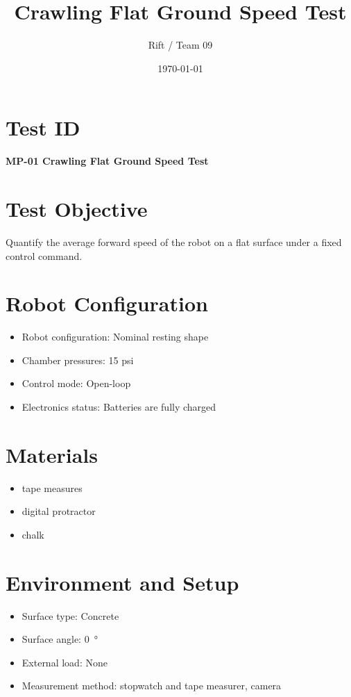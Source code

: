 \documentclass[11pt]{article}
\title{Crawling Flat Ground Speed Test}
\author{Rift / Team 09}
\date{\today}
\begin{document}
\maketitle

\section*{Test ID}
\textbf{MP-01 Crawling Flat Ground Speed Test} 

\section*{Test Objective}
Quantify the average forward speed of the robot on a flat surface under a fixed control command.

\section*{Robot Configuration}
\begin{itemize}[noitemsep]
    \item Robot configuration: Nominal resting shape
    \item Chamber pressures: 15 psi
    \item Control mode: Open-loop
    \item Electronics status: Batteries are fully charged
\end{itemize}

\section*{Materials}
\begin{itemize}[noitemsep]
    \item tape measures
    \item digital protractor
    \item chalk
    
\end{itemize}

\section*{Environment and Setup}
\begin{itemize}[noitemsep]
    \item Surface type: Concrete
    \item Surface angle: 0~\si{\degree}
    \item External load: None 
    \item Measurement method: stopwatch and tape measurer, camera
\end{itemize}
\end{document}
